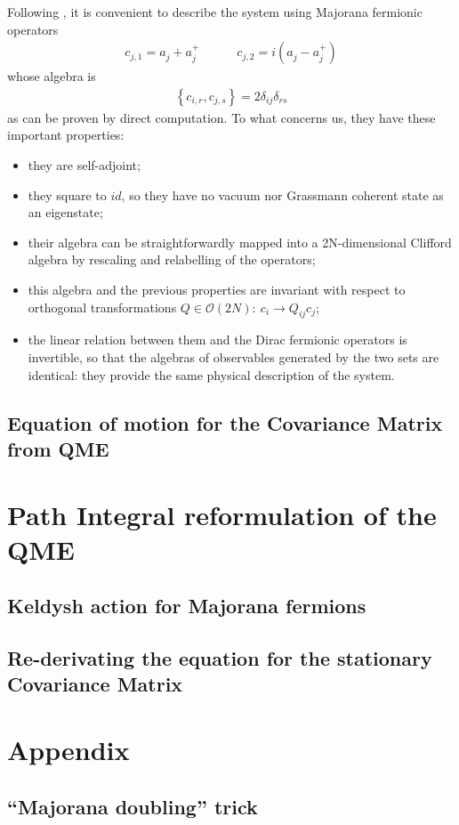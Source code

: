\documentclass[a4paper,11pt]{article}
\begin{document}
 Following \cite{Eisert2010}, it is convenient to describe the system using Majorana fermionic operators
 \begin{align}
  c_{j,1} = a_j^{ }+a_j^{+} \quad \quad \quad
  c_{j,2} = i(a_j^{ }-a_j^{+})
  \label{eq:def_majorana}
 \end{align}
  whose algebra is 
 \begin{align}
  \left\{c_{i,r},c_{j,s}\right\} = 2\delta_{ij}\delta_{rs}
  \label{eq:algebra_majorana}
 \end{align}
  as can be proven by direct computation. To what concerns us, they have these important properties:
  \begin{itemize}
   \item they are self-adjoint;
   \item they square to $id$, so they have no vacuum nor Grassmann coherent state as an eigenstate;
   \item their algebra can be straightforwardly mapped into a 2N-dimensional Clifford algebra by rescaling and relabelling of the operators; 
   \item this algebra and the previous properties are invariant with respect to orthogonal transformations $Q\in\mathcal{O}(2N):\ c_i\rightarrow Q_{ij}c_j$;
   \item the linear relation between them and the Dirac fermionic operators is invertible, so that the algebras of observables generated by the two sets are identical: they provide the same physical description of the system.
  \end{itemize}
  
  
  
  \subsection{Equation of motion for the Covariance Matrix from QME}
 \section{Path Integral reformulation of the QME}
  \subsection{Keldysh action for Majorana fermions}
  \subsection{Re-derivating the equation for the stationary Covariance Matrix}

  \appendix
  \section*{Appendix}
    \renewcommand{\thesection}{A}
    \subsection{``Majorana doubling'' trick}
    \label{sec:majo_doubling_theory}
    
   
   
{}
  
\end{document}
